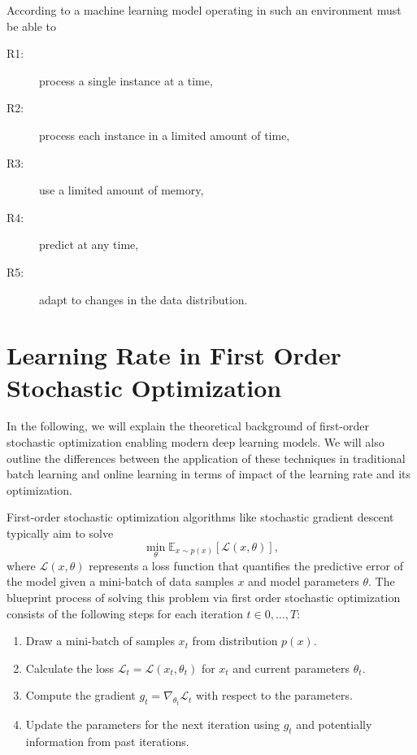 \documentclass[letterpaper]{article} %
\begin{document}
According to \citet{bifetMOAMassiveOnline2010} a machine learning model operating in such an environment must be able to
\begin{center}
	\begin{varwidth}{0.5\textwidth}
		\begin{description}
			\item[R1:] process a single instance at a time,\label{rq:single_instance}
			\item[R2:] process each instance in a limited amount of time,\label{rq:limited_time}
			\item[R3:] use a limited amount of memory,\label{rq:limited_memory}
			\item[R4:] predict at any time,\label{rq:predict_any_time}
			\item[R5:] adapt to changes in the data distribution.\label{rq:adapt_to_drift}
		\end{description}
	\end{varwidth}
\end{center}


\section{Learning Rate in First Order Stochastic Optimization}

In the following, we will explain the theoretical background of first-order stochastic optimization enabling modern deep learning models.
We will also outline the differences between the application of these techniques in traditional batch learning and online learning in terms of impact of the learning rate and its optimization.

First-order stochastic optimization algorithms like stochastic gradient descent typically aim to solve
\begin{equation}
	\min_{\theta} \mathbb{E}_{x \sim p(x)} [\mathcal{L}(x, \theta)],
\end{equation}
where $\mathcal{L}(x, \theta)$ represents a loss function that quantifies the predictive error of the model given a mini-batch of data samples $x$ and model parameters $\theta$.
The blueprint process of solving this problem via first order stochastic optimization consists of the following steps for each iteration $t \in 0, \ldots, T$:
\begin{enumerate}
	\item Draw a mini-batch of samples $x_t$ from distribution $p(x)$.
	\item Calculate the loss $\mathcal{L}_t = \mathcal{L}(x_t, \theta_t)$ for $x_t$ and current parameters $\theta_t$.
	\item Compute the gradient $g_t = \nabla_{\theta_t} \mathcal{L}_t$ with respect to the parameters.
	\item Update the parameters for the next iteration using $g_t$ and potentially information from past iterations.
\end{enumerate}
\end{document}
